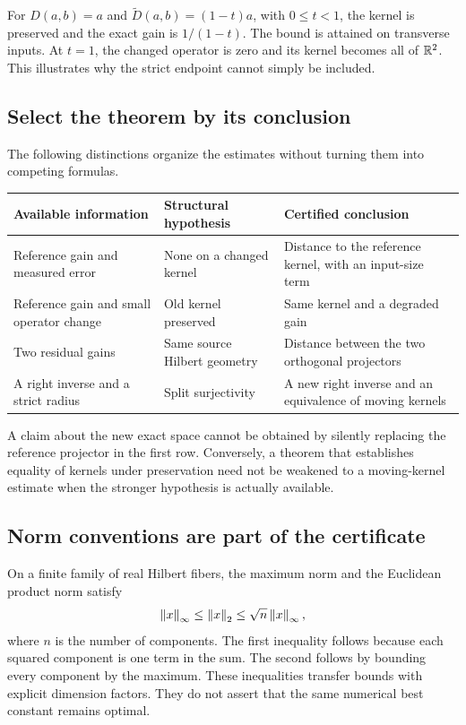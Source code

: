 For \(D(a,b)=a\) and \(\widetilde D(a,b)=(1-t)a\), with \(0\le t<1\), the kernel is preserved and the exact gain is \(1/(1-t)\). The bound is attained on transverse inputs. At \(t=1\), the changed operator is zero and its kernel becomes all of \(\mathbb R^2\). This illustrates why the strict endpoint cannot simply be included.


\subsection{Select the theorem by its conclusion}
The following distinctions organize the estimates without turning them into competing formulas.
\begin{center}
\begin{tabularx}{\linewidth}{@{}p{.29\linewidth}p{.32\linewidth}X@{}}
\toprule
Available information & Structural hypothesis & Certified conclusion\\
\midrule
Reference gain and measured error & None on a changed kernel & Distance to the reference kernel, with an input-size term\\
Reference gain and small operator change & Old kernel preserved & Same kernel and a degraded gain\\
Two residual gains & Same source Hilbert geometry & Distance between the two orthogonal projectors\\
A right inverse and a strict radius & Split surjectivity & A new right inverse and an equivalence of moving kernels\\
\bottomrule
\end{tabularx}
\end{center}
A claim about the new exact space cannot be obtained by silently replacing the reference projector in the first row. Conversely, a theorem that establishes equality of kernels under preservation need not be weakened to a moving-kernel estimate when the stronger hypothesis is actually available.

\subsection{Norm conventions are part of the certificate}
On a finite family of real Hilbert fibers, the maximum norm and the Euclidean product norm satisfy
\[
 \left\lVert x\right\rVert_\infty\le\left\lVert x\right\rVert_2\le\sqrt{n}\left\lVert x\right\rVert_\infty,
\]
where \(n\) is the number of components. The first inequality follows because each squared component is one term in the sum. The second follows by bounding every component by the maximum. These inequalities transfer bounds with explicit dimension factors. They do not assert that the same numerical best constant remains optimal.

